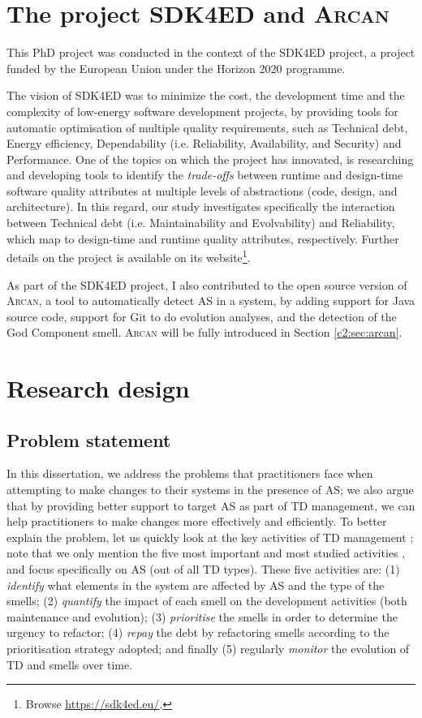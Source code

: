 \section{The project SDK4ED and \textsc{Arcan}}
This PhD project was conducted in the context of the SDK4ED project, a project funded by the European Union under the Horizon 2020 programme.

The vision of SDK4ED was to minimize the cost, the development time and the complexity of low-energy software development projects, by providing tools for automatic optimisation of multiple quality requirements, such as Technical debt, Energy efficiency, Dependability (i.e. Reliability, Availability, and Security) and Performance. 
One of the topics on which the project has innovated, is researching and developing tools to identify the \textit{trade-offs} between runtime and design-time software quality attributes at multiple levels of abstractions (code, design, and architecture).
In this regard, our study investigates specifically the interaction between Technical debt (i.e. Maintainability and Evolvability) and Reliability, which map to design-time and  runtime quality attributes, respectively. Further details on the project is available on its website\footnote{Browse \url{https://sdk4ed.eu/}.}.

As part of the SDK4ED project, I also contributed to the open source version of \textsc{Arcan}, a tool to automatically detect AS in a system, by adding support for Java source code, support for Git to do evolution analyses, and the detection of the God Component smell.
\textsc{Arcan} will be fully introduced in Section \ref{c2:sec:arcan}.

\section{Research design}\label{sec:intro:research-design}
\subsection{Problem statement}\label{sec:intro:problem-statement}
In this dissertation, we address the problems that practitioners face when attempting to make changes to their systems in the presence of AS; we also argue that by providing better support to target AS as part of TD management, we can help practitioners to make changes more effectively and efficiently. 
To better explain the problem, let us quickly look at the key activities of TD management \cite{Li2015}; note that we only mention the five most important and most studied activities \cite{Li2015}, and focus specifically on AS (out of all TD types).
These five activities are: (1) \emph{identify} what elements in the system are affected by AS and the type of the smells; (2) \emph{quantify} the impact of each smell on the development activities (both maintenance and evolution); (3) \emph{prioritise} the smells in order to determine the urgency to refactor; (4) \emph{repay} the debt by refactoring smells according to the prioritisation strategy adopted; and finally (5) regularly \emph{monitor} the evolution of TD and smells over time.

